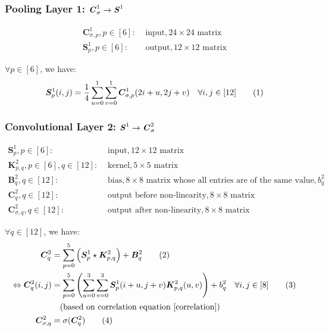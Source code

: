 \documentclass[12pt]{article}
\newcommand\numberthis{\stepcounter{equation}\tag{\theequation}}
\begin{document}
\subsubsection{Pooling Layer 1: $\textbf{\textit{C}}^1_\sigma \rightarrow \textbf{\textit{S}}^1$}

\begin{align*}
    \bm{C}^1_{\sigma, p}, p \in [6]:& \text{ input}, 24 \times 24 \text{ matrix}\\
    \bm{S}^1_p, p \in [6]:& \text{ output}, 12 \times 12 \text{ matrix}
\end{align*}

$\forall p \in [6]$, we have:
\begin{align*}
    \bm{S}^1_p(i, j) = \frac{1}{4}\sum_{u = 0}^1\sum_{v = 0}^1\bm{C}^1_{\sigma, p}(2i + u, 2j + v) \quad \forall i, j \in [12]
    \numberthis \label{S1}
\end{align*}

\subsubsection{Convolutional Layer 2: $\textbf{\textit{S}}^1 \rightarrow \textbf{\textit{C}}^2_\sigma$}

\begin{align*}
    \bm{S}^1_p, p \in [6]:& \text{ input}, 12 \times 12 \text{ matrix}\\
    \bm{K}^2_{p, q}, p \in [6], q \in [12]:& \text{ kernel}, 5 \times 5 \text{ matrix}\\
    \bm{B}^2_q, q \in [12]:& \text{ bias}, 8 \times 8 \text{ matrix whose all entries are of the same value}, b^2_q\\
    \bm{C}^2_q, q \in [12]:& \text{ output before non-linearity}, 8 \times 8 \text{ matrix}\\
    \bm{C}^2_{\sigma, q}, q \in [12]:& \text{ output after non-linearity}, 8 \times 8 \text{ matrix}
\end{align*}

$\forall q \in [12]$, we have:
\begin{align*}
    \bm{C}^2_q &= \sum_{p = 0}^5\Big(\bm{S}^1_p \star  \bm{K}^2_{p, q}\Big) + \bm{B}^2_q
    \numberthis \label{C2}
    \\
    \Leftrightarrow \bm{C}^2_q(i, j) &= \sum_{p = 0}^5\left(\sum_{u = 0}^3\sum_{v = 0}^3\bm{S}^1_p(i + u, j + v)\bm{K}^2_{p, q}(u, v)\right) + b^2_q \quad \forall i, j \in [8]
    \numberthis \label{C2_indexbased}
    \\
    &\quad(\text{based on correlation equation } \eqref{correlation})
    \\
    \bm{C}^2_{\sigma, q} &= \sigma(\bm{C}^2_q)
    \numberthis \label{C2_sigma}
\end{align*}
\end{document}
